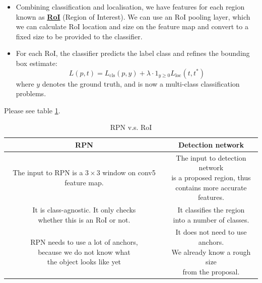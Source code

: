 \documentclass[twocolumn,landscape,10pt]{article}
\theoremstyle{definition}
\begin{document}

\begin{itemize}
    \item Combining classification and localisation, we have features for each
        region known as \underline{\textbf{RoI}} (Region of Interest). We can
        use an RoI pooling layer, which we can calculate RoI location and size
        on the feature map and convert to a fixed size to be provided to the
        classifier.
    \item For each RoI, the classifier predicts the label class and refines the
        bounding box estimate:
        \[
            L(p,t)=L_\text{cls}(p,y)+\lambda\cdot 1_{y\ge 0}L_\text{loc}(t,t^*)
        \]
        where $y$ denotes the ground truth, and is now a multi-class
        classification problems.
\end{itemize} 


Please see table \ref{table:rpn-roi}.

\begin{table}[h]
    \centering
    \caption{RPN v.s. RoI}
    \label{table:rpn-roi}
    \begin{tabular}{c|c}
        RPN & Detection network \\
        \hline \hline
        \rule{0mm}{12mm}
        \shortstack{The input to RPN is a $3\times 3$ \\
            window on conv5 feature map.} &
        \shortstack{The input to detection network \\is a proposed region, thus 
            \\contains more accurate features.} \\
        \hline
        \rule{0mm}{8mm}
        \shortstack{It is class-agnostic. It only checks \\
            whether this is an RoI or not.} &
        \shortstack{It classifies the region \\into a number of classes.} \\
        \hline
        \rule{0mm}{12mm}
        \shortstack{RPN needs to use a lot of anchors, \\
            because we do not know what \\
            the object looks like yet} & 
        \shortstack{It does not need to use anchors.\\
        We already know a rough size \\from the proposal.}
    \end{tabular} 
\end{table} 
\end{document}
